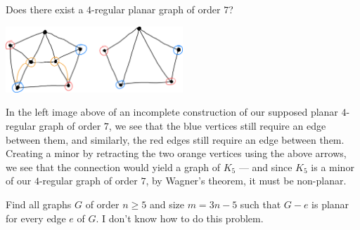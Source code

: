 \documentclass[8pt]{extarticle}
\begin{document}
  \begin{problem}{6}
    Does there exist a $4$-regular planar graph of order $7$?
    \tcblower
    \begin{center}
      \includegraphics[width=0.5\textwidth]{images/10_6_sol.png}
    \end{center}
    In the left image above of an incomplete construction of our supposed planar $4$-regular graph of order $7$, we see that the blue vertices still require an edge between them, and similarly, the red edges still require an edge between them.\\

    Creating a minor by retracting the two orange vertices using the above arrows, we see that the connection would yield a graph of $K_5$ --- and since $K_5$ is a minor of our $4$-regular graph of order $7$, by Wagner's theorem, it must be non-planar.
  \end{problem}
  \begin{problem}{7}
    Find all graphs $G$ of order $n\geq 5$ and size $m = 3n-5$ such that $G-e$ is planar for every edge $e$ of $G$.
    \tcblower
    I don't know how to do this problem.
  \end{problem}
\end{document}
